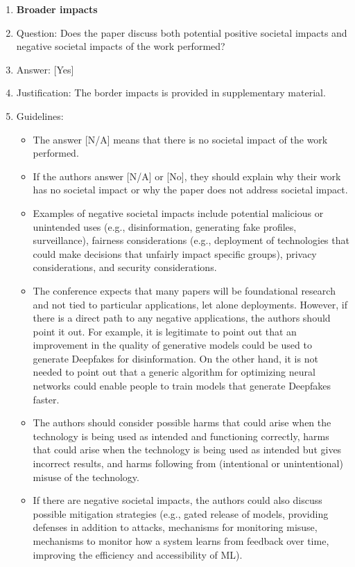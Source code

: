 \documentclass{llmxive}
\providecommand{\answerYes}[1][]{[Yes]#1}
\providecommand{\answerNo}[1][]{[No]#1}
\providecommand{\answerNA}[1][]{[N/A]#1}
\begin{document}
{\begin{enumerate}
\item {\bf Broader impacts}
    \item[] Question: Does the paper discuss both potential positive societal impacts and negative societal impacts of the work performed?
    \item[] Answer: \answerYes{} %
    \item[] Justification: The border impacts is provided in supplementary material.
    \item[] Guidelines:
    \begin{itemize}
        \item The answer \answerNA{} means that there is no societal impact of the work performed.
        \item If the authors answer \answerNA{} or \answerNo, they should explain why their work has no societal impact or why the paper does not address societal impact.
        \item Examples of negative societal impacts include potential malicious or unintended uses (e.g., disinformation, generating fake profiles, surveillance), fairness considerations (e.g., deployment of technologies that could make decisions that unfairly impact specific groups), privacy considerations, and security considerations.
        \item The conference expects that many papers will be foundational research and not tied to particular applications, let alone deployments. However, if there is a direct path to any negative applications, the authors should point it out. For example, it is legitimate to point out that an improvement in the quality of generative models could be used to generate Deepfakes for disinformation. On the other hand, it is not needed to point out that a generic algorithm for optimizing neural networks could enable people to train models that generate Deepfakes faster.
        \item The authors should consider possible harms that could arise when the technology is being used as intended and functioning correctly, harms that could arise when the technology is being used as intended but gives incorrect results, and harms following from (intentional or unintentional) misuse of the technology.
        \item If there are negative societal impacts, the authors could also discuss possible mitigation strategies (e.g., gated release of models, providing defenses in addition to attacks, mechanisms for monitoring misuse, mechanisms to monitor how a system learns from feedback over time, improving the efficiency and accessibility of ML).
    \end{itemize}
    

\end{enumerate}}
\end{document}
